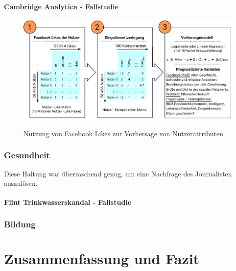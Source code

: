 \documentclass[12pt,a4paper,listof=totoc,oneside]{scrreprt}
\begin{document}
\subsubsection{Cambridge Analytica - Fallstudie}

\begin{figure}%
\centering
\caption{Nutzung von Facebook Likes zur Vorhersage von Nutzerattributen}
\includegraphics[scale=1.0]{Grafiken/Facebook_Likes_Ink.pdf} 
\label{pic:Like_Matrix}
\end{figure}

\subsection{Gesundheit}

Diese Haltung war überraschend genug, um eine Nachfrage des Journalisten
auszulösen.

\subsubsection{Flint Trinkwasserskandal - Fallstudie}

\subsection{Bildung}


\chapter{Zusammenfassung und Fazit}
\end{document}
